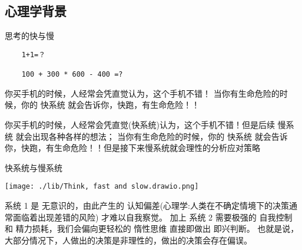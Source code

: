 \documentclass[presentation]{beamer}
\begin{document}
\subsection{心理学背景}
\begin{frame}[fragile]{思考的快与慢}
	\begin{verbatim}
    1+1=？

    100 + 300 * 600 - 400 =?
    \end{verbatim}
	你买手机的时候，人经常会凭直觉认为，这个手机不错！ 当你有生命危险的时候，你的 快系统 就会告诉你，快跑，有生命危险！！

	你买手机的时候，人经常会凭直觉(快系统)认为，这个手机不错！但是后续 慢系统 就会出现各种各样的想法； 当你有生命危险的时候，你的 快系统 就会告诉你，快跑，有生命危险！！但是接下来慢系统就会理性的分析应对策略
\end{frame}
\begin{frame}{快系统与慢系统}
	\begin{center}
		\texttt{[image: ./lib/Think, fast and slow.drawio.png]}
	\end{center}
	系统 1 是 无意识的，由此产生的 认知偏差(心理学:人类在不确定情境下的决策通常面临着出现差错的风险) 才难以自我察觉。 加上 系统 2 需要极强的 自我控制 和 精力损耗，我们会偏向更轻松的 惰性思维 直接即做出 即兴判断。 也就是说，大部分情况下，人做出的决策是非理性的，做出的决策会存在偏误。
\end{frame}
\end{document}

